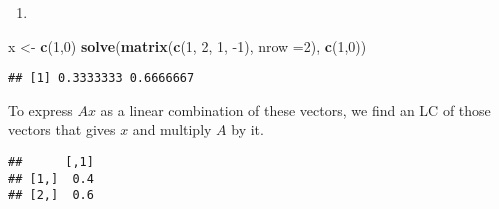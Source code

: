 \documentclass[]{article}
\newenvironment{Shaded}{\begin{snugshade}}{\end{snugshade}}
\newcommand{\DataTypeTok}[1]{\textcolor[rgb]{0.00,0.34,0.68}{#1}}
\newcommand{\DecValTok}[1]{\textcolor[rgb]{0.69,0.50,0.00}{#1}}
\newcommand{\KeywordTok}[1]{\textcolor[rgb]{0.12,0.11,0.11}{\textbf{#1}}}
\newcommand{\NormalTok}[1]{\textcolor[rgb]{0.12,0.11,0.11}{#1}}
\newcommand{\OperatorTok}[1]{\textcolor[rgb]{0.12,0.11,0.11}{#1}}
\newcommand{\StringTok}[1]{\textcolor[rgb]{0.75,0.01,0.01}{#1}}
\begin{document}
\begin{enumerate}
\def\labelenumi{\alph{enumi}.}
\setcounter{enumi}{1}
\item
\end{enumerate}

\begin{Shaded}
\begin{Highlighting}[]
\NormalTok{x <-}\StringTok{ }\KeywordTok{c}\NormalTok{(}\DecValTok{1}\NormalTok{,}\DecValTok{0}\NormalTok{)}
\KeywordTok{solve}\NormalTok{(}\KeywordTok{matrix}\NormalTok{(}\KeywordTok{c}\NormalTok{(}\DecValTok{1}\NormalTok{, }\DecValTok{2}\NormalTok{, }\DecValTok{1}\NormalTok{, }\DecValTok{-1}\NormalTok{), }\DataTypeTok{nrow =}\DecValTok{2}\NormalTok{), }\KeywordTok{c}\NormalTok{(}\DecValTok{1}\NormalTok{,}\DecValTok{0}\NormalTok{))}
\end{Highlighting}
\end{Shaded}

\begin{verbatim}
## [1] 0.3333333 0.6666667
\end{verbatim}

\begin{Shaded}
\end{Shaded}

To express \(Ax\) as a linear combination of these vectors, we find an
LC of those vectors that gives \(x\) and multiply \(A\) by it.

\begin{Shaded}
\end{Shaded}

\begin{verbatim}
##      [,1]
## [1,]  0.4
## [2,]  0.6
\end{verbatim}

\begin{Shaded}
\end{Shaded}
\end{document}
